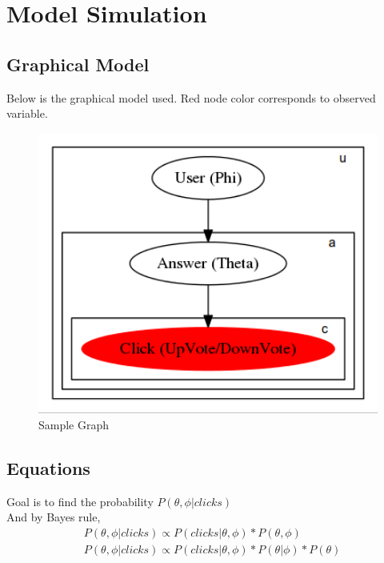 \documentclass{article}
\begin{document}
\section{Model Simulation}
\subsection{Graphical Model}
Below is the graphical model used. Red node color corresponds to observed variable.
\begin{figure}[H]
\centering
\includegraphics[width=12cm]{gm.png}
\caption{Sample Graph}
\label{fig1:overview}
\end{figure}

\subsection{Equations}
Goal is to find the probability $P(\theta, \phi | clicks)$ \\
And by Bayes rule, \\
\begin{equation*}
\begin{split}
    &P(\theta, \phi | clicks) \propto P(clicks | \theta, \phi) * P(\theta,\phi)\\
    &P(\theta, \phi | clicks) \propto P(clicks | \theta, \phi) * P(\theta | \phi)
    * P(\theta)\\
    \\
\end{split}
\end{equation*}\\
\end{document}
